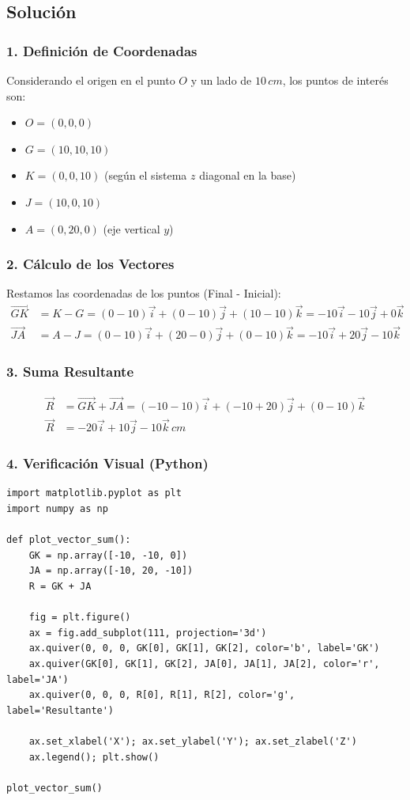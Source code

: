 \documentclass[12pt, a4paper]{article}
\begin{document}
\subsection*{Solución}

\subsubsection*{1. Definición de Coordenadas}
Considerando el origen en el punto $O$ y un lado de $10 \, \si{cm}$, los puntos de interés son:
\begin{itemize}
    \item $O = (0, 0, 0)$
    \item $G = (10, 10, 10)$
    \item $K = (0, 0, 10)$ (según el sistema $z$ diagonal en la base)
    \item $J = (10, 0, 10)$
    \item $A = (0, 20, 0)$ (eje vertical $y$)
\end{itemize}

\subsubsection*{2. Cálculo de los Vectores}
Restamos las coordenadas de los puntos (Final - Inicial):
\begin{align*}
    \vec{GK} &= K - G = (0-10)\vec{i} + (0-10)\vec{j} + (10-10)\vec{k} = -10\vec{i} - 10\vec{j} + 0\vec{k} \\
    \vec{JA} &= A - J = (0-10)\vec{i} + (20-0)\vec{j} + (0-10)\vec{k} = -10\vec{i} + 20\vec{j} - 10\vec{k}
\end{align*}

\subsubsection*{3. Suma Resultante}
\begin{align*}
    \vec{R} &= \vec{GK} + \vec{JA} = (-10-10)\vec{i} + (-10+20)\vec{j} + (0-10)\vec{k} \\
    \vec{R} &= -20\vec{i} + 10\vec{j} - 10\vec{k} \, \si{cm}
\end{align*}

\subsubsection*{4. Verificación Visual (Python)}
\begin{lstlisting}
import matplotlib.pyplot as plt
import numpy as np

def plot_vector_sum():
    GK = np.array([-10, -10, 0])
    JA = np.array([-10, 20, -10])
    R = GK + JA
    
    fig = plt.figure()
    ax = fig.add_subplot(111, projection='3d')
    ax.quiver(0, 0, 0, GK[0], GK[1], GK[2], color='b', label='GK')
    ax.quiver(GK[0], GK[1], GK[2], JA[0], JA[1], JA[2], color='r', label='JA')
    ax.quiver(0, 0, 0, R[0], R[1], R[2], color='g', label='Resultante')
    
    ax.set_xlabel('X'); ax.set_ylabel('Y'); ax.set_zlabel('Z')
    ax.legend(); plt.show()

plot_vector_sum()
\end{lstlisting}
\end{document}
